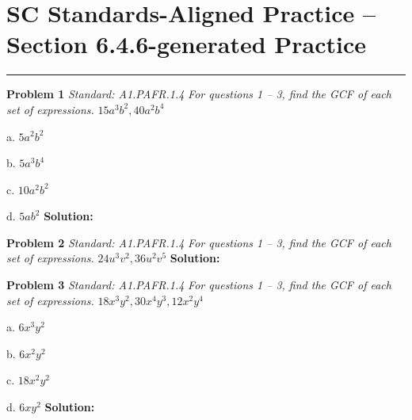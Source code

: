 \documentclass[11pt]{article}
\begin{document}
\section*{SC Standards-Aligned Practice -- Section 6.4.6-generated Practice}
\noindent\rule{\textwidth}{0.5pt}
\vspace{1em}

\begin{minipage}{\textwidth}
\noindent\textbf{Problem 1}
\hfill\textit{\color{gray}Standard: A1.PAFR.1.4}
\vspace{0.3em}
\noindent\textit{For questions 1 – 3, find the GCF of each set of expressions.}
\vspace{0.3em}
\noindent $15a^{3}b^{2}, 40a^{2}b^{4}$

\quad a. $5a^{2}b^{2}$

\quad b. $5a^{3}b^{4}$

\quad c. $10a^{2}b^{2}$

\quad d. $5ab^{2}$
\vspace{0.5em}
\noindent\textbf{Solution:} 
\end{minipage}
\vspace{1.5em}
\hrulefill
\vspace{1.5em}

\begin{minipage}{\textwidth}
\noindent\textbf{Problem 2}
\hfill\textit{\color{gray}Standard: A1.PAFR.1.4}
\vspace{0.3em}
\noindent\textit{For questions 1 – 3, find the GCF of each set of expressions.}
\vspace{0.3em}
\noindent $24u^{3}v^{2}, 36u^{2}v^{5}$
\vspace{0.5em}
\noindent\textbf{Solution:} 
\end{minipage}
\vspace{1.5em}
\hrulefill
\vspace{1.5em}

\begin{minipage}{\textwidth}
\noindent\textbf{Problem 3}
\hfill\textit{\color{gray}Standard: A1.PAFR.1.4}
\vspace{0.3em}
\noindent\textit{For questions 1 – 3, find the GCF of each set of expressions.}
\vspace{0.3em}
\noindent $18x^{3}y^{2}, 30x^{4}y^{3}, 12x^{2}y^{4}$

\quad a. $6x^{3}y^{2}$

\quad b. $6x^{2}y^{2}$

\quad c. $18x^{2}y^{2}$

\quad d. $6xy^{2}$
\vspace{0.5em}
\noindent\textbf{Solution:} 
\end{minipage}
\vspace{1.5em}
\hrulefill
\vspace{1.5em}
\end{document}
